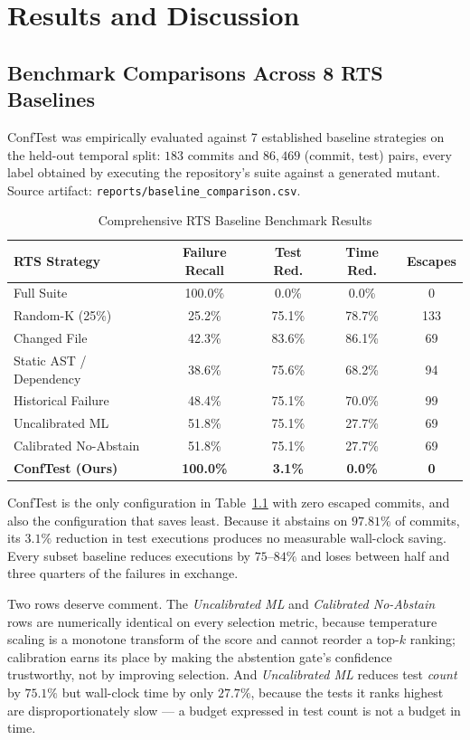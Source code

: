 \chapter{Results and Discussion}

\section{Benchmark Comparisons Across 8 RTS Baselines}
ConfTest was empirically evaluated against 7 established baseline strategies on the held-out temporal split: $183$ commits and $86{,}469$ (commit, test) pairs, every label obtained by executing the repository's suite against a generated mutant. Source artifact: \texttt{reports/baseline\_comparison.csv}.

\begin{table}[htbp]
\centering
\caption{Comprehensive RTS Baseline Benchmark Results}
\label{tab:ktu_baselines}
\small
\begin{tabular}{lcccc}
\toprule
\textbf{RTS Strategy} & \textbf{Failure Recall} & \textbf{Test Red.} & \textbf{Time Red.} & \textbf{Escapes} \\
\midrule
Full Suite & 100.0\% & 0.0\% & 0.0\% & 0 \\
Random-K (25\%) & 25.2\% & 75.1\% & 78.7\% & 133 \\
Changed File & 42.3\% & 83.6\% & 86.1\% & 69 \\
Static AST / Dependency & 38.6\% & 75.6\% & 68.2\% & 94 \\
Historical Failure & 48.4\% & 75.1\% & 70.0\% & 99 \\
Uncalibrated ML & 51.8\% & 75.1\% & 27.7\% & 69 \\
Calibrated No-Abstain & 51.8\% & 75.1\% & 27.7\% & 69 \\
\textbf{ConfTest (Ours)} & \textbf{100.0\%} & \textbf{3.1\%} & \textbf{0.0\%} & \textbf{0} \\
\bottomrule
\end{tabular}
\end{table}

ConfTest is the only configuration in Table~\ref{tab:ktu_baselines} with zero escaped commits, and also
the configuration that saves least. Because it abstains on $97.81\%$ of commits, its $3.1\%$ reduction in
test executions produces no measurable wall-clock saving. Every subset baseline reduces executions by
$75$--$84\%$ and loses between half and three quarters of the failures in exchange.

Two rows deserve comment. The \emph{Uncalibrated ML} and \emph{Calibrated No-Abstain} rows are
numerically identical on every selection metric, because temperature scaling is a monotone transform of
the score and cannot reorder a top-$k$ ranking; calibration earns its place by making the abstention
gate's confidence trustworthy, not by improving selection. And \emph{Uncalibrated ML} reduces test
\emph{count} by $75.1\%$ but wall-clock time by only $27.7\%$, because the tests it ranks highest are
disproportionately slow --- a budget expressed in test count is not a budget in time.

